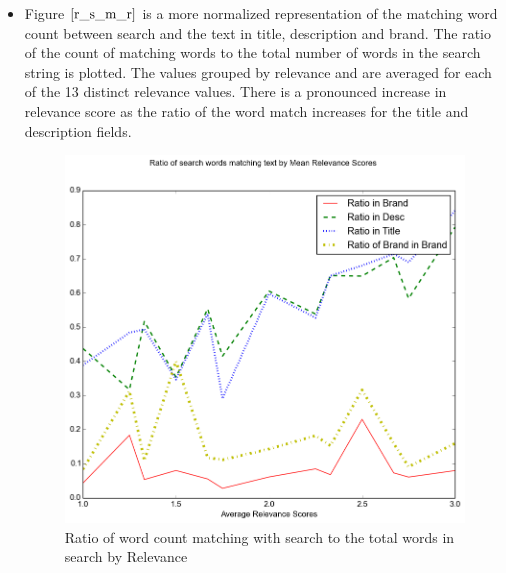 \documentclass[twoside,12pt]{article}
\begin{document}
\begin{itemize}
\FloatBarrier
\item 
Figure $\eqref{r_s_m_r}$ is a more normalized representation of the matching word count between search and the text in title, description and brand. The ratio of the count of matching words to the total number of words in the search string is plotted. The values grouped by relevance and are averaged for each of the 13 distinct relevance values. There is a pronounced increase in relevance score as the ratio of the word match increases for the title and description fields.
\FloatBarrier
\begin{figure}[!htbp]
	\centering
	\includegraphics[scale=.43]{DataVisualization/ratio_relv_plot.png} 
	\caption{Ratio of word count matching with search to the total words in search by Relevance}
	\label{r_s_m_r}
\end{figure}


\end{itemize}
\end{document}
